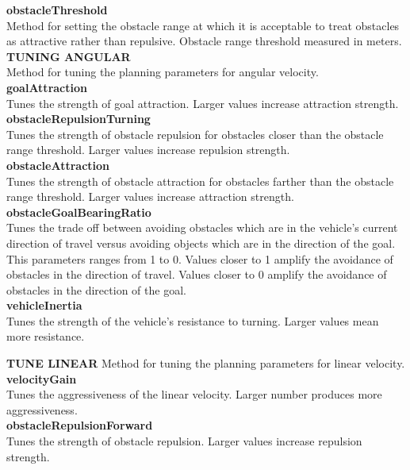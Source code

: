 \textbf{obstacleThreshold}         \\
Method for setting the obstacle range at which it is acceptable to treat obstacles
as attractive rather than repulsive.
Obstacle range threshold measured in meters. \\

\textbf{TUNING ANGULAR} \\
Method for tuning the planning parameters for angular velocity. \\

\textbf{goalAttraction}            \\
Tunes the strength of goal attraction.
Larger values increase attraction strength. \\

\textbf{obstacleRepulsionTurning}  \\
Tunes the strength of obstacle repulsion for 
obstacles closer than the obstacle range threshold.
Larger values increase repulsion strength. \\

\textbf{obstacleAttraction}        \\
Tunes the strength of obstacle attraction for 
obstacles farther than the obstacle range threshold.
Larger values increase attraction strength. \\

\textbf{obstacleGoalBearingRatio}  \\
Tunes the trade off between avoiding obstacles 
which are in the vehicle's current direction 
of travel versus avoiding objects which are 
in the direction of the goal.
This parameters ranges from 1 to 0. 
Values closer to 1 amplify the avoidance of 
obstacles in the direction of travel.
Values closer to 0 amplify the avoidance of 
obstacles in the direction of the goal. \\

\textbf{vehicleInertia}            \\
Tunes the strength of the vehicle's resistance 
to turning. Larger values mean more resistance.

\textbf{TUNE LINEAR}
 Method for tuning the planning parameters for linear velocity.
\textbf{velocityGain}              \\
Tunes the aggressiveness of the linear velocity. 
Larger number produces more aggressiveness. \\

\textbf{obstacleRepulsionForward}  \\
Tunes the strength of obstacle repulsion.
Larger values increase repulsion strength.\\

